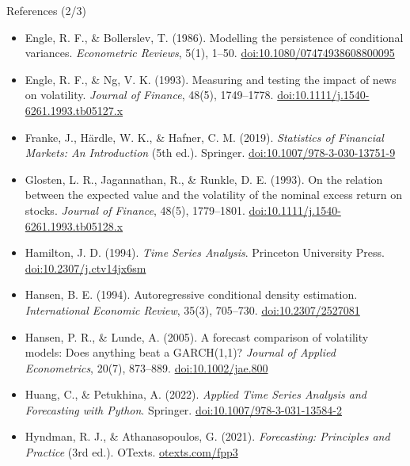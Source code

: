 \begin{frame}{References (2/3)}
\itemsize{\scriptsize}
\begin{itemize}
    \item Engle, R. F., \& Bollerslev, T. (1986). Modelling the persistence of conditional variances. \textit{Econometric Reviews}, 5(1), 1--50. \href{https://doi.org/10.1080/07474938608800095}{doi:10.1080/07474938608800095}
    \item Engle, R. F., \& Ng, V. K. (1993). Measuring and testing the impact of news on volatility. \textit{Journal of Finance}, 48(5), 1749--1778. \href{https://doi.org/10.1111/j.1540-6261.1993.tb05127.x}{doi:10.1111/j.1540-6261.1993.tb05127.x}
    \item Franke, J., Härdle, W. K., \& Hafner, C. M. (2019). \textit{Statistics of Financial Markets: An Introduction} (5th ed.). Springer. \href{https://doi.org/10.1007/978-3-030-13751-9}{doi:10.1007/978-3-030-13751-9}
    \item Glosten, L. R., Jagannathan, R., \& Runkle, D. E. (1993). On the relation between the expected value and the volatility of the nominal excess return on stocks. \textit{Journal of Finance}, 48(5), 1779--1801. \href{https://doi.org/10.1111/j.1540-6261.1993.tb05128.x}{doi:10.1111/j.1540-6261.1993.tb05128.x}
    \item Hamilton, J. D. (1994). \textit{Time Series Analysis}. Princeton University Press. \href{https://doi.org/10.2307/j.ctv14jx6sm}{doi:10.2307/j.ctv14jx6sm}
    \item Hansen, B. E. (1994). Autoregressive conditional density estimation. \textit{International Economic Review}, 35(3), 705--730. \href{https://doi.org/10.2307/2527081}{doi:10.2307/2527081}
    \item Hansen, P. R., \& Lunde, A. (2005). A forecast comparison of volatility models: Does anything beat a GARCH(1,1)? \textit{Journal of Applied Econometrics}, 20(7), 873--889. \href{https://doi.org/10.1002/jae.800}{doi:10.1002/jae.800}
    \item Huang, C., \& Petukhina, A. (2022). \textit{Applied Time Series Analysis and Forecasting with Python}. Springer. \href{https://doi.org/10.1007/978-3-031-13584-2}{doi:10.1007/978-3-031-13584-2}
    \item Hyndman, R. J., \& Athanasopoulos, G. (2021). \textit{Forecasting: Principles and Practice} (3rd ed.). OTexts. \href{https://otexts.com/fpp3/}{otexts.com/fpp3}
\end{itemize}
\end{frame}

